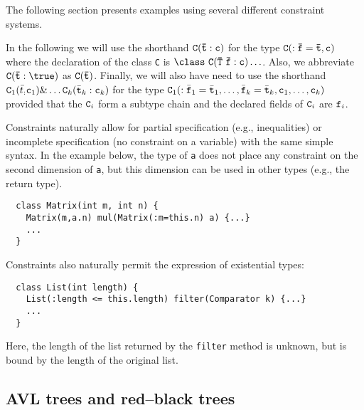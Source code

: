 %
%
%
%
%
%

The following section presents examples using several different
constraint systems.

In the following we will use the shorthand $\tt C(\bar{t}:c)$ for the
type $\tt C(:\bar{f}=\bar{t},c)$ where the declaration of the class
{\tt C} is $\tt \class\ C(\bar{\tt T}\ \bar{\tt f}:c)\ldots$.  Also,
we abbreviate $\tt C(\bar{t}:\true)$ as $\tt C(\bar{t})$.  Finally, we
will also have need to use the shorthand
${\tt C}_1(\bar{t}_:{\tt c}_1)\& \ldots {\tt C}_k(\bar{\tt t}_k:{\tt c}_k)$
for the type
${\tt C}_1(:\bar{\tt f}_1=\bar{\tt t}_1, \ldots,
            \bar{\tt f}_k=\bar{\tt t}_k,{\tt c}_1,\ldots,{\tt c}_k)$ 
provided that the ${\tt C}_i$ form a subtype chain
and the declared fields of ${\tt C}_i$ are ${\tt f}_i$.

Constraints naturally allow for partial specification
(e.g., inequalities) or incomplete specification (no constraint on a
variable) with the same simple syntax. In the example below,
the type of {\tt a} does not place any constraint on the second
dimension of {\tt a}, but this dimension can be used in other
types (e.g., the return type).
{\footnotesize
\begin{verbatim}
  class Matrix(int m, int n) {
    Matrix(m,a.n) mul(Matrix(:m=this.n) a) {...}
    ...
  }
\end{verbatim}}

Constraints also naturally permit the expression of existential types:
{\footnotesize
\begin{verbatim}
  class List(int length) { 
    List(:length <= this.length) filter(Comparator k) {...} 
    ...
  }
\end{verbatim}}
\noindent
Here, the length of the list returned by the {\tt filter} method is 
unknown, but is bound by the length of the original list.

\subsection{AVL trees and red--black trees}

